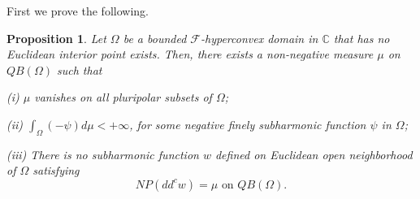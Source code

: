 \documentclass[3p,times]{elsarticle}
\numberwithin{equation}{section}
\newtheorem{proposition}[theorem]{Proposition}
\newtheorem{The main theorem}[theorem]{The main theorem}
\theoremstyle{definition}
\begin{document}

First we prove the following. 

\begin{proposition}
Let $\Omega $ be a   bounded $\mathcal F$-hyperconvex domain in $\mathbb C$ that has no Euclidean interior point exists.
Then, there exists a non-negative measure $\mu$ on $QB(\Omega)$ such that

(i) $\mu$ vanishes on all pluripolar subsets of $\Omega$;

(ii) $\int_\Omega (-\psi) d \mu <+\infty $, for some negative finely subharmonic function $\psi$ in $\Omega$;  

(iii)  There is no subharmonic function $w$ defined on Euclidean open neighborhood of $\Omega$ satisfying  $$
NP(dd^c w) =\mu \text{ on } QB(\Omega).
$$ 
\end{proposition}
\end{document}
